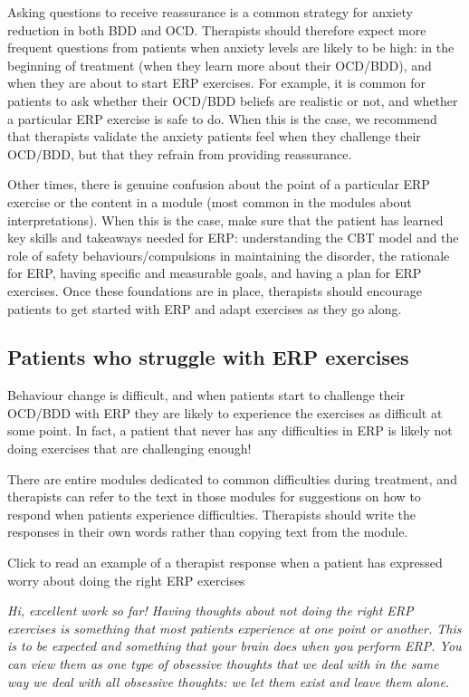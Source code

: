 \documentclass[]{book}
\theoremstyle{definition}
\theoremstyle{definition}
\theoremstyle{definition}
\theoremstyle{remark}
\begin{document}
Asking questions to receive reassurance is a common strategy for anxiety
reduction in both BDD and OCD. Therapists should therefore expect more
frequent questions from patients when anxiety levels are likely to be
high: in the beginning of treatment (when they learn more about their
OCD/BDD), and when they are about to start ERP exercises. For example,
it is common for patients to ask whether their OCD/BDD beliefs are
realistic or not, and whether a particular ERP exercise is safe to do.
When this is the case, we recommend that therapists validate the anxiety
patients feel when they challenge their OCD/BDD, but that they refrain
from providing reassurance.

Other times, there is genuine confusion about the point of a particular
ERP exercise or the content in a module (most common in the modules
about interpretations). When this is the case, make sure that the
patient has learned key skills and takeaways needed for ERP:
understanding the CBT model and the role of safety
behaviours/compulsions in maintaining the disorder, the rationale for
ERP, having specific and measurable goals, and having a plan for ERP
exercises. Once these foundations are in place, therapists should
encourage patients to get started with ERP and adapt exercises as they
go along.

\hypertarget{patients-who-struggle-with-erp-exercises}{%
\subsection{Patients who struggle with ERP
exercises}\label{patients-who-struggle-with-erp-exercises}}

Behaviour change is difficult, and when patients start to challenge
their OCD/BDD with ERP they are likely to experience the exercises as
difficult at some point. In fact, a patient that never has any
difficulties in ERP is likely not doing exercises that are challenging
enough!

There are entire modules dedicated to common difficulties during
treatment, and therapists can refer to the text in those modules for
suggestions on how to respond when patients experience difficulties.
Therapists should write the responses in their own words rather than
copying text from the module.

 Click to read an example of a therapist response when a patient has
expressed worry about doing the right ERP exercises

\emph{Hi, excellent work so far! Having thoughts about not doing the
right ERP exercises is something that most patients experience at one
point or another. This is to be expected and something that your brain
does when you perform ERP. You can view them as one type of obsessive
thoughts that we deal with in the same way we deal with all obsessive
thoughts: we let them exist and leave them alone.}
\end{document}
